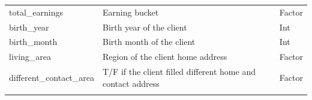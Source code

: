 \documentclass[
]{article}
\begin{document}
\begin{longtable}[]{@{}lll@{}}
\begin{minipage}[t]{0.30\columnwidth}
total\_earnings\strut
\end{minipage} & \begin{minipage}[t]{0.30\columnwidth}\raggedright
Earning bucket\strut
\end{minipage} & \begin{minipage}[t]{0.30\columnwidth}\raggedright
Factor\strut
\end{minipage}\tabularnewline
\begin{minipage}[t]{0.30\columnwidth}\raggedright
birth\_year\strut
\end{minipage} & \begin{minipage}[t]{0.30\columnwidth}\raggedright
Birth year of the client\strut
\end{minipage} & \begin{minipage}[t]{0.30\columnwidth}\raggedright
Int\strut
\end{minipage}\tabularnewline
\begin{minipage}[t]{0.30\columnwidth}\raggedright
birth\_month\strut
\end{minipage} & \begin{minipage}[t]{0.30\columnwidth}\raggedright
Birth month of the client\strut
\end{minipage} & \begin{minipage}[t]{0.30\columnwidth}\raggedright
Int\strut
\end{minipage}\tabularnewline
\begin{minipage}[t]{0.30\columnwidth}\raggedright
living\_area\strut
\end{minipage} & \begin{minipage}[t]{0.30\columnwidth}\raggedright
Region of the client home address\strut
\end{minipage} & \begin{minipage}[t]{0.30\columnwidth}\raggedright
Factor\strut
\end{minipage}\tabularnewline
\begin{minipage}[t]{0.30\columnwidth}\raggedright
different\_contact\_area\strut
\end{minipage} & \begin{minipage}[t]{0.30\columnwidth}\raggedright
T/F if the client filled different home and contact address\strut
\end{minipage} & \begin{minipage}[t]{0.30\columnwidth}\raggedright
Factor\strut
\end{minipage}\tabularnewline
\begin{minipage}[t]{0.30\columnwidth}\raggedright

\end{minipage}
\end{longtable}
\end{document}
